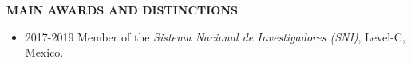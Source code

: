 
\item{\bf MAIN AWARDS AND DISTINCTIONS}

\begin{itemize}
	\item 2017-2019 Member of the \textit{Sistema Nacional de Investigadores (SNI)}, Level-C, Mexico. 
\end{itemize}

